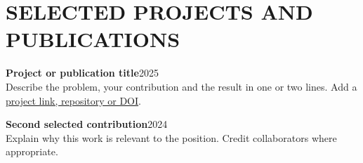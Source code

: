 \section{SELECTED PROJECTS AND PUBLICATIONS}
\textbf{Project or publication title}\hfill{\small 2025}\\
Describe the problem, your contribution and the result in one or two lines.
Add a \href{https://example.com}{project link, repository or DOI}.\par
\vspace{3pt}
\textbf{Second selected contribution}\hfill{\small 2024}\\
Explain why this work is relevant to the position. Credit collaborators where appropriate.
